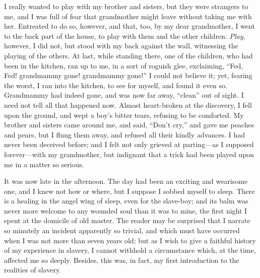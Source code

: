 I really wanted to play with my brother and sisters, but they were
strangers to me, and I was full of {}fear that grandmother might leave
without taking me with her. Entreated to do so, however, and that, too,
by my dear grandmother, I went to the back part of the house, to play
with them and the other children. \emph{Play}, however, I did not, but
stood with my back against the wall, witnessing the playing of the
others. At last, while standing there, one of the children, who had been
in the kitchen, ran up to me, in a sort of roguish glee, exclaiming,
``Fed, Fed! grandmammy gone! grandmammy gone!'' I could not believe it;
yet, fearing the worst, I ran into the kitchen, to see for myself, and
found it even so. Grandmammy had indeed gone, and was now far away,
``clean'' out of sight. I need not tell all that happened now. Almost
heart-broken at the discovery, I fell upon the ground, and wept a boy's
bitter tears, refusing to be comforted. My brother and sisters came
around me, and said, ``Don't cry,'' and gave me peaches and pears, but I
flung them away, and refused all their kindly advances. I had never been
deceived before; and I felt not only grieved at parting---as I supposed
forever---with my grandmother, but indignant that a trick had been
played upon me in a matter so serious.

It was now late in the afternoon. The day had been an exciting and
wearisome one, and I knew not how or where, but I suppose I sobbed
myself to sleep. There is a healing in the angel wing of sleep, even for
the slave-boy; and its balm was never more welcome to any wounded soul
than it was to mine, the first night I spent at the domicile of old
master. The reader may be surprised that I narrate so minutely {}an
incident apparently so trivial, and which must have occurred when I was
not more than seven years old; but as I wish to give a faithful history
of my experience in slavery, I cannot withhold a circumstance which, at
the time, affected me so deeply. Besides, this was, in fact, my first
introduction to the realities of slavery.

~
